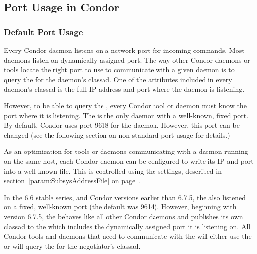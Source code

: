 \subsection{\label{sec:Port-Details}Port Usage in Condor}



\subsubsection{\label{sec:Ports-Standard}Default Port Usage}

Every Condor daemon listens on a network port for incoming commands.
Most daemons listen on dynamically assigned port.
The way other Condor daemons or tools locate the right port to use to
communicate with a given daemon is to query the  for
the daemon's classad.
One of the attributes included in every daemon's classad is the full
IP address and port where the daemon is listening.

However, to be able to query the , every Condor tool
or daemon must know the port where it is listening.
The  is the only daemon with a well-known, fixed
port.
By default, Condor uses port 9618 for the  daemon.
However, this port can be changed (see the following section on
non-standard port usage for details.)

As an optimization for tools or daemons communicating with a daemon
running on the same host, each Condor daemon can be configured to
write its IP and port into a well-known file.
This is controlled using the  settings,
described in section~\ref{param:SubsysAddressFile} on
page~\pageref{param:SubsysAddressFile}. 

\Note In the 6.6 stable series, and Condor versions earlier than
6.7.5, the  also listened on a fixed, well-known
port (the default was 9614).
However, beginning with version 6.7.5, the  behaves
like all other Condor daemons and publishes its own classad to the
 which includes the dynamically assigned port it is
listening on.
All Condor tools and daemons that need to communicate with the
 will either use the
 or will query the
 for the negotiator's classad.


